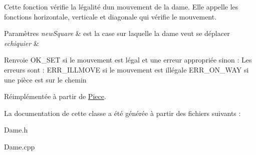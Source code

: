Cette fonction vérifie la légalité d\textquotesingle{}un mouvement de la dame. Elle appelle les fonctions horizontale, verticale et diagonale qui vérifie le mouvement. 


\begin{DoxyParams}{Paramètres}
{\em new\+Square} & est la case sur laquelle la dame veut se déplacer \\
\hline
{\em echiquier} & \\
\hline
\end{DoxyParams}
\begin{DoxyReturn}{Renvoie}
O\+K\+\_\+\+S\+ET si le mouvement est légal et une erreur appropriée sinon \+: Les erreurs sont \+: E\+R\+R\+\_\+\+I\+L\+L\+M\+O\+VE si le mouvement est illégale E\+R\+R\+\_\+\+O\+N\+\_\+\+W\+AY si une pièce est sur le chemin 
\end{DoxyReturn}


Réimplémentée à partir de \hyperlink{classPiece_a7003f6b90284237191f00bb6038a3bd3}{Piece}.



La documentation de cette classe a été générée à partir des fichiers suivants \+:\begin{DoxyCompactItemize}
\item 
Dame.\+h\item 
Dame.\+cpp\end{DoxyCompactItemize}
